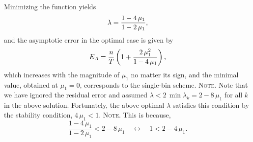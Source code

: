 \documentclass[preprint, floatfix]{revtex4-1}
\newcommand{\note}[1]{{\color{DarkGreen}\footnotesize \textsc{Note.} #1}}
\newcommand{\Err}{E}
\begin{document}
%
Minimizing the function yields
%
\begin{equation}
  \lambda
  =
  \frac{ 1 - 4 \, \mu_1 }
       { 1 - 2 \, \mu_1 }
  ,
\notag
\end{equation}
%
and the asymptotic error in the optimal case is given by
%
\begin{equation}
  \Err_A
  =
  \frac{n}{T}
  \left(
    1+ \frac{2 \, \mu_1^2}{1-4 \, \mu_1}
  \right)
  ,
\notag
\end{equation}
%
which
increases with the magnitude of $\mu_1$
no matter its sign,
and the minimal value, obtained at $\mu_1 = 0$,
corresponds to the single-bin scheme.
%
\note{Note that
we have ignored the residual error
and assumed $\lambda < 2 \, \min \lambda_k = 2 - 8 \, \mu_1$
for all $k$ in the above solution.
%
Fortunately,
the above optimal $\lambda$ %
satisfies this condition
by the stability condition,
$4 \, \mu_1 < 1$.
}%
\note{This is because,
$$
\frac{ 1 - 4 \, \mu_1 } { 1 - 2 \, \mu_1 } < 2 - 8 \, \mu_1
\quad \leftrightarrow \quad
1 < 2 - 4 \, \mu_1.
$$
}%
\end{document}
